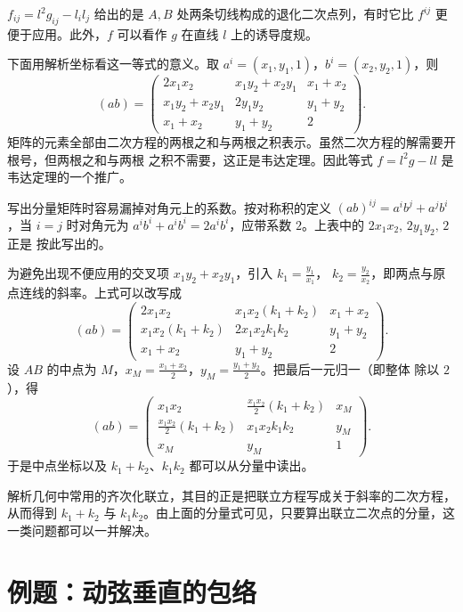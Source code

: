 \begin{remark}
$f_{ij}=l^2g_{ij}-l_il_j$ 给出的是 $A,B$ 处两条切线构成的退化二次点列，有时它比 $f^{ij}$ 更
便于应用。此外，$f$ 可以看作 $g$ 在直线 $l$ 上的诱导度规。
\end{remark}

下面用解析坐标看这一等式的意义。取 $a^i=(x_1,y_1,1)$，$b^i=(x_2,y_2,1)$，则
\[
(ab)=\begin{pmatrix}
2x_1x_2 & x_1y_2+x_2y_1 & x_1+x_2\\
x_1y_2+x_2y_1 & 2y_1y_2 & y_1+y_2\\
x_1+x_2 & y_1+y_2 & 2
\end{pmatrix}.
\]
矩阵的元素全部由二次方程的两根之和与两根之积表示。虽然二次方程的解需要开根号，但两根之和与两根
之积不需要，这正是韦达定理。因此等式 $f=l^2g-ll$ 是韦达定理的一个推广。

\begin{remark}[对角元的系数]
写出分量矩阵时容易漏掉对角元上的系数。按对称积的定义 $(ab)^{ij}=a^ib^j+a^jb^i$，当 $i=j$
时对角元为 $a^ib^i+a^ib^i=2a^ib^i$，应带系数 $2$。上表中的 $2x_1x_2,\,2y_1y_2,\,2$ 正是
按此写出的。
\end{remark}

为避免出现不便应用的交叉项 $x_1y_2+x_2y_1$，引入 $k_1=\frac{y_1}{x_1}$，
$k_2=\frac{y_2}{x_2}$，即两点与原点连线的斜率。上式可以改写成
\[
(ab)=\begin{pmatrix}
2x_1x_2 & x_1x_2(k_1+k_2) & x_1+x_2\\
x_1x_2(k_1+k_2) & 2x_1x_2k_1k_2 & y_1+y_2\\
x_1+x_2 & y_1+y_2 & 2
\end{pmatrix}.
\]
设 $AB$ 的中点为 $M$，$x_M=\frac{x_1+x_2}{2}$，$y_M=\frac{y_1+y_2}{2}$。把最后一元归一（即整体
除以 $2$），得
\[
(ab)=\begin{pmatrix}
x_1x_2 & \frac{x_1x_2}{2}(k_1+k_2) & x_M\\[3pt]
\frac{x_1x_2}{2}(k_1+k_2) & x_1x_2k_1k_2 & y_M\\[3pt]
x_M & y_M & 1
\end{pmatrix}.
\]
于是中点坐标以及 $k_1+k_2$、$k_1k_2$ 都可以从分量中读出。

解析几何中常用的齐次化联立，其目的正是把联立方程写成关于斜率的二次方程，从而得到 $k_1+k_2$ 与
$k_1k_2$。由上面的分量式可见，只要算出联立二次点的分量，这一类问题都可以一并解决。

\section{例题：动弦垂直的包络}

